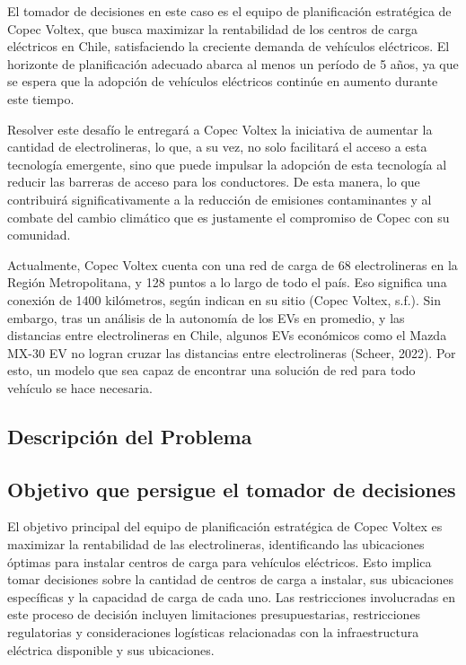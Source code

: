 \documentclass[letterpaper]{article}
\begin{document}
\begin{flushleft}
		El tomador de decisiones en este caso es el equipo de planificación estratégica de Copec Voltex, que busca maximizar la rentabilidad de los centros de carga eléctricos en Chile, satisfaciendo la creciente demanda de vehículos eléctricos. El horizonte de planificación adecuado abarca al menos un período de 5 años, ya que se espera que la adopción de vehículos eléctricos continúe en aumento durante este tiempo. 

		Resolver este desafío le entregará a Copec Voltex la iniciativa de aumentar la cantidad de electrolineras, lo que, a su vez, no solo facilitará el acceso a esta tecnología emergente, sino que puede impulsar la adopción de esta tecnología al reducir las barreras de acceso para los conductores. De esta manera, lo que contribuirá significativamente a la reducción de emisiones contaminantes y al combate del cambio climático que es justamente el compromiso de Copec con su comunidad. 

		Actualmente, Copec Voltex cuenta con una red de carga de 68 electrolineras en la Región Metropolitana, y 128 puntos a lo largo de todo el país. Eso significa una conexión de 1400 kilómetros, según indican en su sitio (Copec Voltex, s.f.). Sin embargo, tras un análisis de la autonomía de los EVs en promedio, y las distancias entre electrolineras en Chile, algunos EVs económicos como el Mazda MX-30 EV no logran cruzar las distancias entre electrolineras (Scheer, 2022). Por esto, un modelo que sea capaz de encontrar una solución de red para todo vehículo se hace necesaria. 
 
		\subsection{Descripción del Problema}
		\subsection{Objetivo que persigue el tomador de decisiones}
		El objetivo principal del equipo de planificación estratégica de Copec Voltex es maximizar la rentabilidad de las electrolineras, identificando las ubicaciones óptimas para instalar centros de carga para vehículos eléctricos. Esto implica tomar decisiones sobre la cantidad de centros de carga a instalar, sus ubicaciones específicas y la capacidad de carga de cada uno. Las restricciones involucradas en este proceso de decisión incluyen limitaciones presupuestarias, restricciones regulatorias y consideraciones logísticas relacionadas con la infraestructura eléctrica disponible y sus ubicaciones. 		

\end{flushleft}
\end{document}
